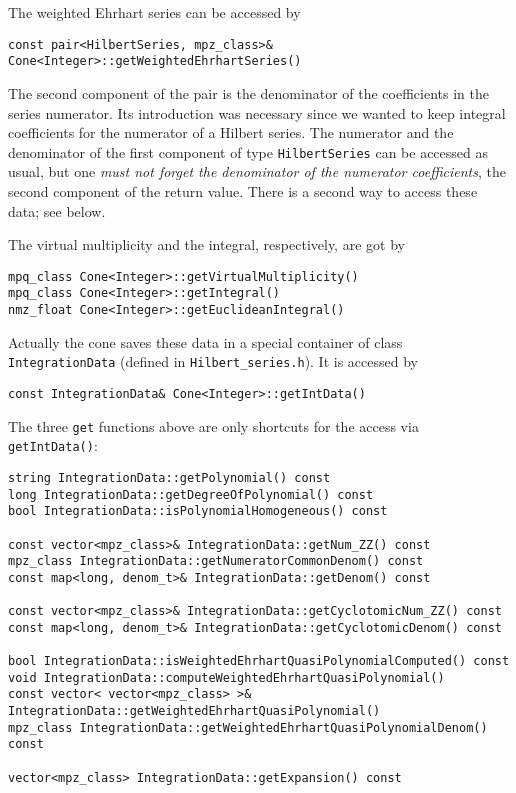 \documentclass[12pt,a4paper]{scrartcl}
\theoremstyle{definition}
\begin{document}
\begin{small}
The weighted Ehrhart series can be accessed by
\begin{Verbatim}
const pair<HilbertSeries, mpz_class>& Cone<Integer>::getWeightedEhrhartSeries()
\end{Verbatim}
The second component of the pair is the denominator of the coefficients in the series numerator. Its introduction was necessary since we wanted to keep integral coefficients for the numerator of a Hilbert series. The numerator and the denominator of the first component of type \verb|HilbertSeries| can be accessed as usual, but one \emph{must not forget the denominator of the numerator coefficients}, the second component of the return value. There is a second way to access these data; see below.

The virtual multiplicity and the integral, respectively, are got by
\begin{Verbatim}
mpq_class Cone<Integer>::getVirtualMultiplicity()
mpq_class Cone<Integer>::getIntegral()
nmz_float Cone<Integer>::getEuclideanIntegral()
\end{Verbatim}

Actually the cone saves these data in a special container of class \verb|IntegrationData| (defined in \verb|Hilbert_series.h|). It is accessed by
\begin{Verbatim}
const IntegrationData& Cone<Integer>::getIntData()
\end{Verbatim}
The three \verb|get| functions above are only shortcuts for the access via \verb|getIntData()|:
\begin{Verbatim}
string IntegrationData::getPolynomial() const
long IntegrationData::getDegreeOfPolynomial() const
bool IntegrationData::isPolynomialHomogeneous() const

const vector<mpz_class>& IntegrationData::getNum_ZZ() const
mpz_class IntegrationData::getNumeratorCommonDenom() const
const map<long, denom_t>& IntegrationData::getDenom() const

const vector<mpz_class>& IntegrationData::getCyclotomicNum_ZZ() const
const map<long, denom_t>& IntegrationData::getCyclotomicDenom() const

bool IntegrationData::isWeightedEhrhartQuasiPolynomialComputed() const
void IntegrationData::computeWeightedEhrhartQuasiPolynomial()
const vector< vector<mpz_class> >& IntegrationData::getWeightedEhrhartQuasiPolynomial()
mpz_class IntegrationData::getWeightedEhrhartQuasiPolynomialDenom() const

vector<mpz_class> IntegrationData::getExpansion() const


\end{Verbatim}
\end{small}
\end{document}

